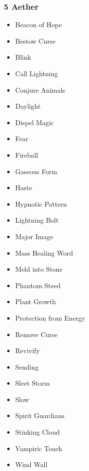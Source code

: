 \subsubsection{5 Aether}
\begin{itemize}
\item Beacon of Hope
\item Bestow Curse
\item Blink
\item Call Lightning
\item Conjure Animals
\item Daylight
\item Dispel Magic
\item Fear
\item Fireball
\item Gaseous Form
\item Haste
\item Hypnotic Pattern
\item Lightning Bolt
\item Major Image
\item Mass Healing Word
\item Meld into Stone
\item Phantom Steed
\item Plant Growth
\item Protection from Energy
\item Remove Curse
\item Revivify
\item Sending
\item Sleet Storm
\item Slow
\item Spirit Guardians
\item Stinking Cloud
\item Vampiric Touch
\item Wind Wall
\end{itemize}

